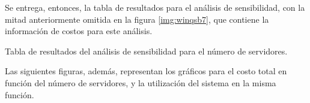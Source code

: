 Se entrega, entonces, la tabla de resultados para el análisis de sensibilidad, con la mitad anteriormente omitida en la figura \ref{img:winqsb7}, que contiene la información de costos para este análisis.
\begin{images}[\label{img:winqsb11-12}]{Tabla de resultados del análisis de sensibilidad para el número de servidores.}
\end{images}

Las siguientes figuras, además, representan los gráficos para el costo total en función del número de servidores, y la utilización del sistema en la misma función.



\pagebreak